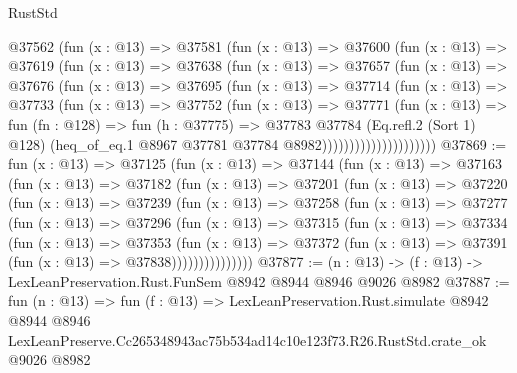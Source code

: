 \begin{lexlean}{RustStd}
\begin{coremodule}
                  @37562
                    (fun (x : @13) =>
                    @37581
                      (fun (x : @13) =>
                      @37600
                        (fun (x : @13) =>
                        @37619
                          (fun (x : @13) =>
                          @37638
                            (fun (x : @13) =>
                            @37657
                              (fun (x : @13) =>
                              @37676
                                (fun (x : @13) =>
                                @37695
                                  (fun (x : @13) =>
                                  @37714
                                    (fun (x : @13) =>
                                    @37733
                                      (fun (x : @13) =>
                                      @37752
                                        (fun (x : @13) =>
                                        @37771
                                          (fun (x : @13) =>
                                          fun (fn : @128) =>
                                          fun (h : @37775) =>
                                          @37783
                                            @37784
                                            (Eq.refl.{2} (Sort 1) @128)
                                            (heq_of_eq.{1}
                                              @8967
                                              @37781
                                              @37784
                                              @8982)))))))))))))))))))))
@37869 := fun (x : @13) =>
  @37125
    (fun (x : @13) =>
    @37144
      (fun (x : @13) =>
      @37163
        (fun (x : @13) =>
        @37182
          (fun (x : @13) =>
          @37201
            (fun (x : @13) =>
            @37220
              (fun (x : @13) =>
              @37239
                (fun (x : @13) =>
                @37258
                  (fun (x : @13) =>
                  @37277
                    (fun (x : @13) =>
                    @37296
                      (fun (x : @13) =>
                      @37315
                        (fun (x : @13) =>
                        @37334
                          (fun (x : @13) =>
                          @37353
                            (fun (x : @13) =>
                            @37372 (fun (x : @13) => @37391 (fun (x : @13) => @37838)))))))))))))))
@37877 := (n : @13) -> (f : @13) -> LexLeanPreservation.Rust.FunSem @8942 @8944 @8946 @9026 @8982
@37887 := fun (n : @13) =>
  fun (f : @13) =>
  LexLeanPreservation.Rust.simulate
    @8942
    @8944
    @8946
    LexLeanPreserve.Cc265348943ac75b534ad14c10e123f73.R26.RustStd.crate_ok
    @9026
    @8982
\end{coremodule}
\end{lexlean}

